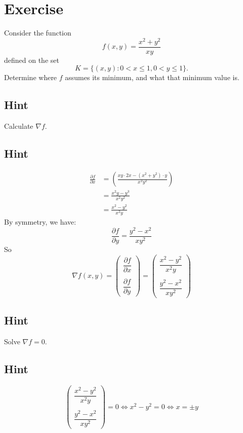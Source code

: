 \documentclass[a4paper,10pt]{article}
\begin{document}
\clearpage

\section{Exercise}

Consider the function
\[
    f(x,y) = \frac{x^2 + y^2}{xy}
\]
defined on the set
\[
    K = \{(x,y): 0 < x \leq 1, 0 < y \leq 1\}.
\]
Determine where $f$ assumes its minimum, and what that minimum value is.

\subsection{Hint}
Calculate $\nabla f$.

\subsection{Hint}
\begin{align*}
    \frac{\partial f}{\partial x} & = \left(\frac{xy\cdot 2x - (x^2+y^2)\cdot y}{x^2y^2}\right) \\
                                  & = \frac{x^2y - y^3}{x^2y^2}                                 \\
                                  & = \frac{x^2 - y^2}{x^2y}
\end{align*}
By symmetry, we have:
\[
    \frac{\partial f}{\partial y} = \frac{y^2 - x^2}{xy^2}
\]
So
\[
    \nabla f(x,y) = \begin{pmatrix}
        \dfrac{\partial f}{\partial x} \\ \\ \dfrac{\partial f}{\partial y}
    \end{pmatrix} = \begin{pmatrix}
        \dfrac{x^2 - y^2}{x^2y} \\ \\ \dfrac{y^2 - x^2}{xy^2}
    \end{pmatrix}
\]

\subsection{Hint}
Solve $\nabla f = 0$.

\subsection{Hint}
\[
    \begin{pmatrix}
        \dfrac{x^2 - y^2}{x^2y} \\ \\ \dfrac{y^2 - x^2}{xy^2}
    \end{pmatrix} = 0 \iff x^2 - y^2 = 0 \iff x = \pm y
\]
\end{document}
